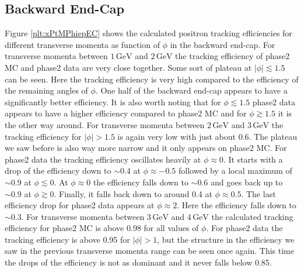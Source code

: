 \documentclass[a4paper,11pt,twosided,final,german,openbib,pdftex,listof=totoc,bibliography=totoc]{scrbook}
\begin{document}
\newpage

\subsection{Backward End-Cap}

Figure \ref{plt:xPtMPhiepEC} shows the calculated positron tracking efficiencies for different transverse momenta as function of $\phi$ in the backward end-cap. 
For transverse momenta between $1\,\textrm{GeV}$ and $2\,\textrm{GeV}$ the tracking efficiency of phase2 MC and phase2 data are very close together. Some sort of plateau at $|\phi| \lesssim 1.5$ can be seen. Here the tracking efficiency is very high compared to the efficiency of the remaining angles of $\phi$. One half of the backward end-cap appears to have a significantly better efficiency. It is also worth noting that for $\phi \lesssim 1.5$ phase2 data appears to have a higher efficiency compared to phase2 MC and for $\phi \gtrsim 1.5$ it is the other way around. 
For transverse momenta between $2\,\textrm{GeV}$ and $3\,\textrm{GeV}$ the tracking efficiency for $|\phi| >1.5$ is again very low with just about 0.6. The plateau we saw before is also way more narrow and it only appears on phase2 MC. For phase2 data the tracking efficiency oscillates heavily at $\phi \approx 0$. It starts with a drop of the efficiency down to $\sim 0.4$ at $\phi \approx -0.5$ followed by a local maximum of $\sim 0.9$ at $\phi \lesssim 0$. At $\phi \approx 0 $ the efficiency falls down to $\sim 0.6$ and goes back up to $\sim 0.9$ at $\phi \gtrsim 0$. Finally, it falls back down to around 0.4 at $\phi \approx 0.5$. The last efficiency drop for phase2 data appears at $\phi \approx 2$. Here the efficiency falls down to $\sim 0.3$. 
For transverse momenta between $3\,\textrm{GeV}$ and $4\,\textrm{GeV}$ the calculated tracking efficiency for phase2 MC is above 0.98 for all values of $\phi$. For phase2 data the tracking efficiency is above 0.95 for $|\phi| > 1$, but the structure in the efficiency we saw in the previous transverse momenta range can be seen once again. This time the drops of the efficiency is not as dominant and it never falls below 0.85.
\end{document}
